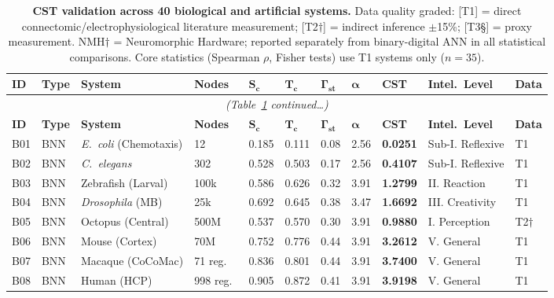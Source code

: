 \documentclass[12pt]{article}
\begin{document}
\newpage
\begin{longtable}{p{0.6cm}p{0.7cm}p{3.2cm}p{1.0cm}p{0.7cm}p{0.7cm}p{0.7cm}p{0.7cm}p{0.9cm}p{1.8cm}p{0.5cm}}
\caption{\textbf{CST validation across 40 biological and artificial systems.} Data quality graded: [T1] = direct connectomic/electrophysiological literature measurement; [T2$\dagger$] = indirect inference $\pm$15\%; [T3\S] = proxy measurement. NMH$\dagger$ = Neuromorphic Hardware; reported separately from binary-digital ANN in all statistical comparisons. Core statistics (Spearman $\rho$, Fisher tests) use T1 systems only ($n=35$).}
\label{tab:validation} \\
\toprule
\textbf{ID} & \textbf{Type} & \textbf{System} & \textbf{Nodes} & $\boldsymbol{S_c}$ & $\boldsymbol{T_c}$ & $\boldsymbol{\Gamma_{st}}$ & $\boldsymbol{\alpha}$ & \textbf{CST} & \textbf{Intel.\ Level} & \textbf{Data} \\
\midrule
\endfirsthead
\multicolumn{11}{c}{\small\itshape (Table~\ref{tab:validation} continued\ldots)} \\
\toprule
\textbf{ID} & \textbf{Type} & \textbf{System} & \textbf{Nodes} & $\boldsymbol{S_c}$ & $\boldsymbol{T_c}$ & $\boldsymbol{\Gamma_{st}}$ & $\boldsymbol{\alpha}$ & \textbf{CST} & \textbf{Intel.\ Level} & \textbf{Data} \\
\midrule
\endhead
\bottomrule
\endlastfoot
B01 & BNN & \textit{E.\ coli} (Chemotaxis) & 12 & 0.185 & 0.111 & 0.08 & 2.56 & \textbf{0.0251} & Sub-I. Reflexive & T1 \\
B02 & BNN & \textit{C.\ elegans} & 302 & 0.528 & 0.503 & 0.17 & 2.56 & \textbf{0.4107} & Sub-I. Reflexive & T1 \\
B03 & BNN & Zebrafish (Larval) & 100k & 0.586 & 0.626 & 0.32 & 3.91 & \textbf{1.2799} & II. Reaction & T1 \\
B04 & BNN & \textit{Drosophila} (MB) & 25k & 0.692 & 0.645 & 0.38 & 3.47 & \textbf{1.6692} & III. Creativity & T1 \\
B05 & BNN & Octopus (Central) & 500M & 0.537 & 0.570 & 0.30 & 3.91 & \textbf{0.9880} & I. Perception & T2$\dagger$ \\
B06 & BNN & Mouse (Cortex) & 70M & 0.752 & 0.776 & 0.44 & 3.91 & \textbf{3.2612} & V. General & T1 \\
B07 & BNN & Macaque (CoCoMac) & 71 reg.\ & 0.836 & 0.801 & 0.44 & 3.91 & \textbf{3.7400} & V. General & T1 \\
B08 & BNN & Human (HCP) & 998 reg.\ & 0.905 & 0.872 & 0.41 & 3.91 & \textbf{3.9198} & V. General & T1 \\

\end{longtable}
\end{document}
